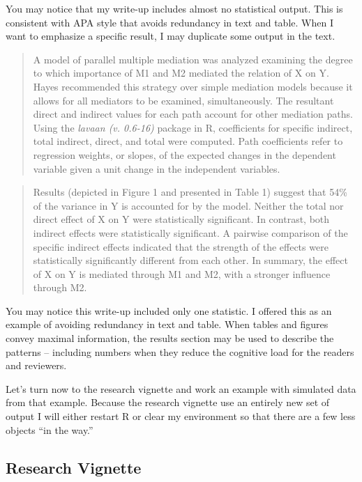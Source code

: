 \documentclass[
  11pt,
]{book}
\begin{document}
You may notice that my write-up includes almost no statistical output. This is consistent with APA style that avoids redundancy in text and table. When I want to emphasize a specific result, I may duplicate some output in the text.

\begin{quote}
A model of parallel multiple mediation was analyzed examining the degree to which importance of M1 and M2 mediated the relation of X on Y. Hayes \citeyearpar{hayes_more_2022} recommended this strategy over simple mediation models because it allows for all mediators to be examined, simultaneously. The resultant direct and indirect values for each path account for other mediation paths. Using the \emph{lavaan (v. 0.6-16)} package in R, coefficients for specific indirect, total indirect, direct, and total were computed. Path coefficients refer to regression weights, or slopes, of the expected changes in the dependent variable given a unit change in the independent variables.
\end{quote}

\begin{quote}
Results (depicted in Figure 1 and presented in Table 1) suggest that 54\% of the variance in Y is accounted for by the model. Neither the total nor direct effect of X on Y were statistically significant. In contrast, both indirect effects were statistically significant. A pairwise comparison of the specific indirect effects indicated that the strength of the effects were statistically significantly different from each other. In summary, the effect of X on Y is mediated through M1 and M2, with a stronger influence through M2.
\end{quote}

You may notice this write-up included only one statistic. I offered this as an example of avoiding redundancy in text and table. When tables and figures convey maximal information, the results section may be used to describe the patterns -- including numbers when they reduce the cognitive load for the readers and reviewers.

Let's turn now to the research vignette and work an example with simulated data from that example. Because the research vignette use an entirely new set of output I will either restart R or clear my environment so that there are a few less objects ``in the way.''

\hypertarget{research-vignette-5}{%
\subsection{Research Vignette}\label{research-vignette-5}}
\end{document}
